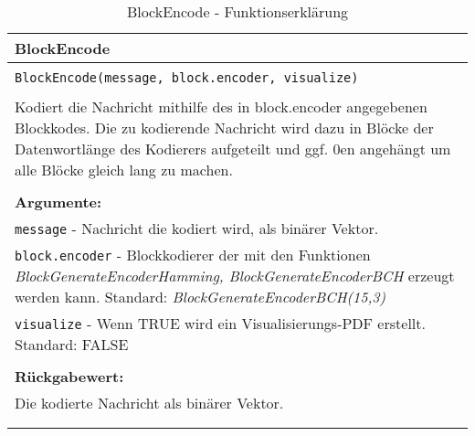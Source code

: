 \begin{longtable}{|p{\textwidth}|}
\hline
\rowcolor{lightblue}BlockEncode\\
\hline
\\
\texttt{BlockEncode(message, block.encoder, visualize)}\\
\\
Kodiert die Nachricht mithilfe des in block.encoder angegebenen Blockkodes. Die zu kodierende Nachricht wird dazu in Blöcke der Datenwortlänge des Kodierers aufgeteilt und ggf. 0en angehängt um alle Blöcke gleich lang zu machen. \\
\\
\textbf{Argumente:}\\
\texttt{message} - Nachricht die kodiert wird, als binärer Vektor.\\
\texttt{block.encoder} - Blockkodierer der mit den Funktionen \emph{BlockGenerateEncoderHamming, BlockGenerateEncoderBCH} erzeugt werden kann. Standard: \emph{BlockGenerateEncoderBCH(15,3)}\\
\texttt{visualize} - Wenn TRUE wird ein Visualisierungs-PDF erstellt. Standard: FALSE\\
\\
\textbf{Rückgabewert:}\\
Die kodierte Nachricht als binärer Vektor.\\
\\
\hline
\caption{BlockEncode - Funktionserklärung}
\end{longtable}